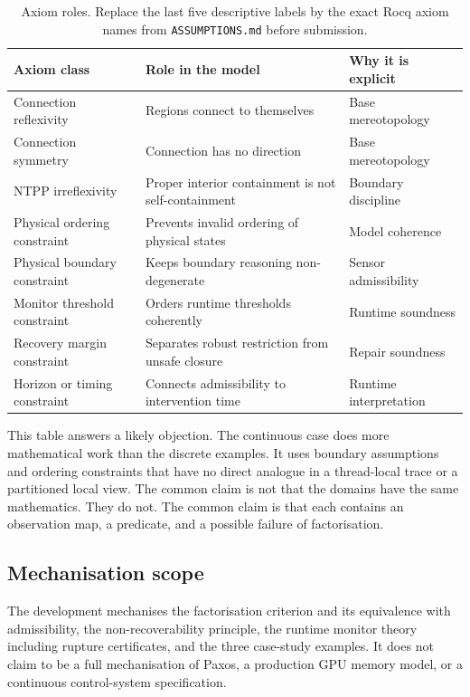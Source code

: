 \documentclass[a4paper,11pt]{article}
\begin{document}
\begin{table}[h]
\centering
\begin{tabular}{lll}
\toprule
Axiom class & Role in the model & Why it is explicit \\
\midrule
Connection reflexivity & Regions connect to themselves & Base mereotopology \\
Connection symmetry & Connection has no direction & Base mereotopology \\
NTPP irreflexivity & Proper interior containment is not self-containment & Boundary discipline \\
Physical ordering constraint & Prevents invalid ordering of physical states & Model coherence \\
Physical boundary constraint & Keeps boundary reasoning non-degenerate & Sensor admissibility \\
Monitor threshold constraint & Orders runtime thresholds coherently & Runtime soundness \\
Recovery margin constraint & Separates robust restriction from unsafe closure & Repair soundness \\
Horizon or timing constraint & Connects admissibility to intervention time & Runtime interpretation \\
\bottomrule
\end{tabular}
\caption{Axiom roles. Replace the last five descriptive labels by the exact Rocq axiom names from \texttt{ASSUMPTIONS.md} before submission.}
\label{tab:axiom-roles}
\end{table}

This table answers a likely objection. The continuous case does more
mathematical work than the discrete examples. It uses boundary assumptions and
ordering constraints that have no direct analogue in a thread-local trace or a
partitioned local view. The common claim is not that the domains have the same
mathematics. They do not. The common claim is that each contains an observation
map, a predicate, and a possible failure of factorisation.

\subsection{Mechanisation scope}

The development mechanises the factorisation criterion and its equivalence with
admissibility, the non-recoverability principle, the runtime monitor theory
including rupture certificates, and the three case-study examples. It does not
claim to be a full mechanisation of Paxos, a production GPU memory model, or a
continuous control-system specification.
\end{document}
